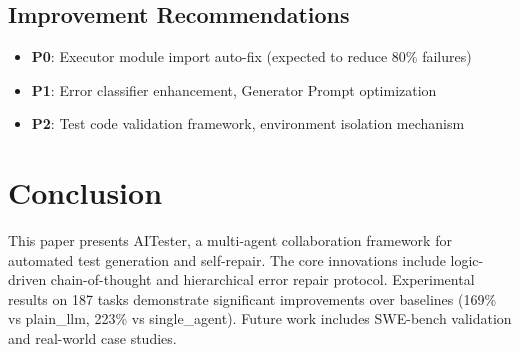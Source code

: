 \documentclass[10pt, conference]{ieeeconf}
\begin{document}
\subsection{Improvement Recommendations}
\begin{itemize}
    \item \textbf{P0}: Executor module import auto-fix (expected to reduce 80\% failures)
    \item \textbf{P1}: Error classifier enhancement, Generator Prompt optimization
    \item \textbf{P2}: Test code validation framework, environment isolation mechanism
\end{itemize}

\section{Conclusion}

This paper presents AITester, a multi-agent collaboration framework for automated test generation and self-repair. The core innovations include logic-driven chain-of-thought and hierarchical error repair protocol. Experimental results on 187 tasks demonstrate significant improvements over baselines (169\% vs plain\_llm, 223\% vs single\_agent). Future work includes SWE-bench validation and real-world case studies.



\end{document}
